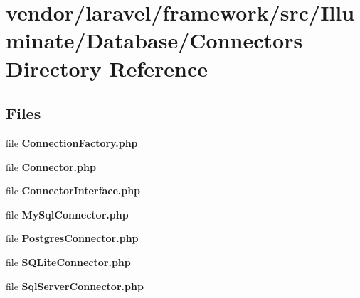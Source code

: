 \section{vendor/laravel/framework/src/\+Illuminate/\+Database/\+Connectors Directory Reference}
\label{dir_45bf96da8cccaa1681e9e16bb7f46f84}
\subsection*{Files}
\begin{DoxyCompactItemize}
\item 
file {\bf Connection\+Factory.\+php}
\item 
file {\bf Connector.\+php}
\item 
file {\bf Connector\+Interface.\+php}
\item 
file {\bf My\+Sql\+Connector.\+php}
\item 
file {\bf Postgres\+Connector.\+php}
\item 
file {\bf S\+Q\+Lite\+Connector.\+php}
\item 
file {\bf Sql\+Server\+Connector.\+php}
\end{DoxyCompactItemize}
